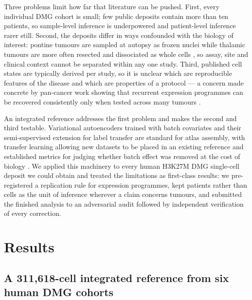 \documentclass[12pt,a4paper]{article}
\begin{document}
Three problems limit how far that literature can be pushed. First, every individual DMG cohort is small; few public
deposits contain more than ten patients, so sample-level inference is underpowered and patient-level inference rarer
still. Second, the deposits differ in ways confounded with the biology of interest: pontine tumours are sampled at
autopsy as frozen nuclei \citep{okada2026singlenucleus} while thalamic tumours are more often resected and dissociated
as whole cells \citep{desisto2024tumor}, so assay, site and clinical context cannot be separated within any one study.
Third, published cell states are typically derived per study, so it is unclear which are reproducible features of the
disease and which are properties of a protocol --- a concern made concrete by pan-cancer work showing that recurrent
expression programmes can be recovered consistently only when tested across many tumours
\citep{gavish2023hallmarks}.

An integrated reference addresses the first problem and makes the second and third testable. Variational autoencoders
trained with batch covariates \citep{lopez2018deep} and their semi-supervised extension for label transfer
\citep{xu2021probabilistic} are standard for atlas assembly, with transfer learning allowing new datasets to be placed
in an existing reference \citep{lotfollahi2021mapping} and established metrics for judging whether batch effect was
removed at the cost of biology \citep{luecken2021benchmarking}. We applied this machinery to every human H3K27M DMG
single-cell deposit we could obtain and treated the limitations as first-class results: we pre-registered a replication
rule for expression programmes, kept patients rather than cells as the unit of inference wherever a claim concerns
tumours, and submitted the finished analysis to an adversarial audit followed by independent verification of every
correction.

\section{Results}

\subsection{A 311,618-cell integrated reference from six human DMG cohorts}
\end{document}
